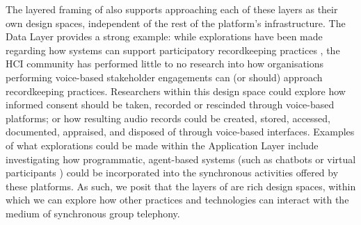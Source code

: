 The layered framing of \ONT{} also supports approaching each of these layers as their own design spaces, independent of the rest of the platform's infrastructure. The Data Layer provides a strong example: while explorations have been made regarding how systems can support participatory recordkeeping practices \cite{rolan2017}, the HCI community has performed little to no research into how organisations performing voice-based stakeholder engagements can (or should) approach recordkeeping practices. Researchers within this design space could explore how informed consent should be taken, recorded or rescinded through voice-based platforms; or how resulting audio records could be created, stored, accessed, documented, appraised, and disposed of through voice-based interfaces. Examples of what explorations could be made within the Application Layer include investigating how programmatic, agent-based systems (such as chatbots \cite{Jain2018, Yadav2019} or virtual participants \cite{Bartindale2021}) could be incorporated into the synchronous activities offered by these platforms. As such, we posit that the layers of \ONT{} are rich design spaces, within which we can explore how other practices and technologies can interact with the medium of synchronous group telephony.